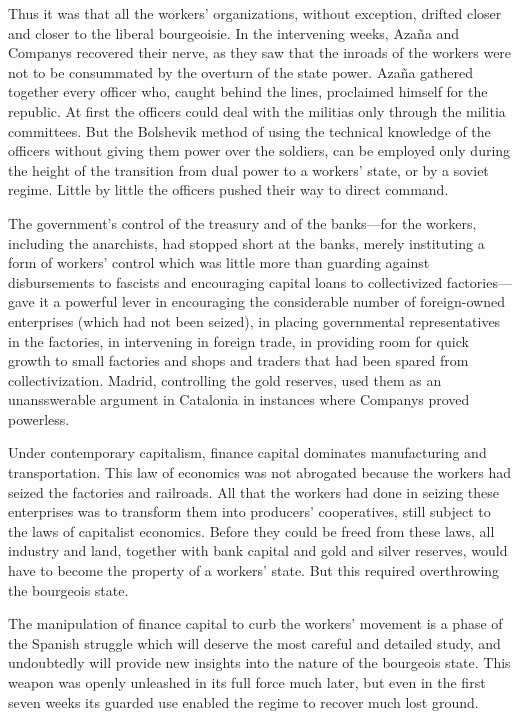 Thus it was that all the workers’ organizations, without exception, drifted closer and closer to the liberal bourgeoisie. In the intervening weeks, Azaña and Companys recovered their nerve, as they saw that the inroads of the workers were not to be consummated by the overturn of the state power. Azaña gathered together every officer who, caught behind the lines, proclaimed himself for the republic. At first the officers could deal with the militias only through the militia committees. But the Bolshevik method of using the technical knowledge of the officers without giving them power over the soldiers, can be employed only during the height of the transition from dual power to a workers’ state, or by a soviet regime. Little by little the officers pushed their way to direct command.

The government’s control of the treasury and of the banks---for the workers, including the anarchists, had stopped short at the banks, merely instituting a form of workers’ control which was little more than guarding against disbursements to fascists and encouraging capital loans to collectivized factories---gave it a powerful lever in encouraging the considerable number of foreign-owned enterprises (which had not been seized), in placing governmental representatives in the factories, in intervening in foreign trade, in providing room for quick growth to small factories and shops and traders that had been spared from collectivization. Madrid, controlling the gold reserves, used them as an unansswerable argument in Catalonia in instances where Companys proved powerless.

Under contemporary capitalism, finance capital dominates manufacturing and transportation. This law of economics was not abrogated because the workers had seized the factories and railroads. All that the workers had done in seizing these enterprises was to transform them into producers’ cooperatives, still subject to the laws of capitalist economics. Before they could be freed from these laws, all industry and land, together with bank capital and gold and silver reserves, would have to become the property of a workers’ state. But this required overthrowing the bourgeois state.

The manipulation of finance capital to curb the workers’ movement is a phase of the Spanish struggle which will deserve the most careful and detailed study, and undoubtedly will provide new insights into the nature of the bourgeois state. This weapon was openly unleashed in its full force much later, but even in the first seven weeks its guarded use enabled the regime to recover much lost ground.
\nowidow

